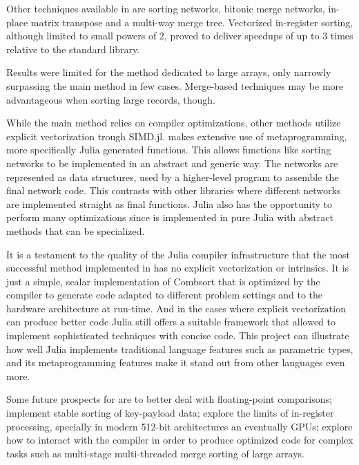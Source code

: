 \documentclass{juliacon}
\begin{document}
Other techniques available in \chipsort are sorting networks, bitonic merge networks, in-place matrix transpose and a multi-way merge tree. Vectorized in-register sorting, although limited to small powers of 2, proved to deliver speedups of up to 3 times relative to the standard library.

Results were limited for the method dedicated to large arrays, only narrowly surpassing the main \chipsort method in few cases. Merge-based techniques may be more advantageous when sorting large records, though.

While the main \chipsort method relies on compiler optimizations, other methods utilize explicit vectorization trough SIMD.jl. \chipsort makes extensive use of metaprogramming, more specifically Julia generated functions. This allows functions like sorting networks to be implemented in an abstract and generic way. The networks are represented as data structures, used by a higher-level program to assemble the final network code. This contrasts with other libraries where different networks are implemented straight as final functions. Julia also has the opportunity to perform many optimizations since \chipsort is implemented in pure Julia with abstract methods that can be specialized.

It is a testament to the quality of the Julia compiler infrastructure that the most successful method implemented in \chipsort has no explicit vectorization or intrinsics. It is just a simple, scalar implementation of Combsort that is optimized by the compiler to generate code adapted to different problem settings and to the hardware architecture at run-time. And in the cases where explicit vectorization can produce better code Julia still offers a suitable framework that allowed \chipsort to implement sophisticated techniques with concise code. This project can illustrate how well Julia implements traditional language features such as parametric types, and its metaprogramming features make it stand out from other languages even more.

Some future prospects for \chipsort are to better deal with floating-point comparisons; implement stable sorting of key-payload data; explore the limits of in-register processing, specially in modern 512-bit architectures an eventually GPUs; explore how to interact with the compiler in order to produce optimized code for complex tasks such as multi-stage multi-threaded merge sorting of large arrays.





\end{document}
